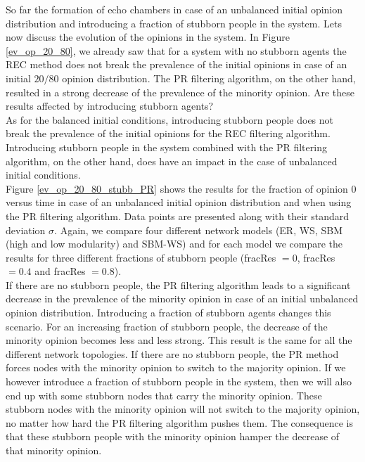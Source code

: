 \documentclass[11 pt , letterpaper , twoside , openright]{book}
\begin{document}
\noindent
So far the formation of echo chambers in case of an unbalanced initial opinion distribution and introducing a fraction of stubborn people in the system. Lets now discuss the evolution of the opinions in the system. In Figure \ref{ev_op_20_80}, we already saw that for a system with no stubborn agents the REC method does not break the prevalence of the initial opinions in case of an initial $20/80$ opinion distribution. The PR filtering algorithm, on the other hand, resulted in a strong decrease of the prevalence of the minority opinion. Are these results affected by introducing stubborn agents?\\
As for the balanced initial conditions, introducing stubborn people does not break the prevalence of the initial opinions for the REC filtering algorithm. Introducing stubborn people in the system combined with the PR filtering algorithm, on the other hand, does have an impact in the case of unbalanced initial conditions.\\
Figure \ref{ev_op_20_80_stubb_PR} shows the results for the fraction of opinion 0 versus time in case of an unbalanced initial opinion distribution and when using the PR filtering algorithm. Data points are presented along with their standard deviation $\sigma$. Again, we compare four different network models (ER, WS, SBM (high and low modularity) and SBM-WS) and for each model we compare the results for three different fractions of stubborn people (fracRes $=0$, fracRes $=0.4$ and fracRes $=0.8$). \\
If there are no stubborn people, the PR filtering algorithm leads to a significant decrease in the prevalence of the minority opinion in case of an initial unbalanced opinion distribution. Introducing a fraction of stubborn agents changes this scenario. For an increasing fraction of stubborn people, the decrease of the minority opinion becomes less and less strong. This result is the same for all the different network topologies. If there are no stubborn people, the PR method forces nodes with the minority opinion to switch to the majority opinion. If we however introduce a fraction of stubborn people in the system, then we will also end up with some stubborn nodes that carry the minority opinion. These stubborn nodes with the minority opinion will not switch to the majority opinion, no matter how hard the PR filtering algorithm pushes them. The consequence is that these stubborn people with the minority opinion hamper the decrease of that minority opinion. \\
\newline
\end{document}
